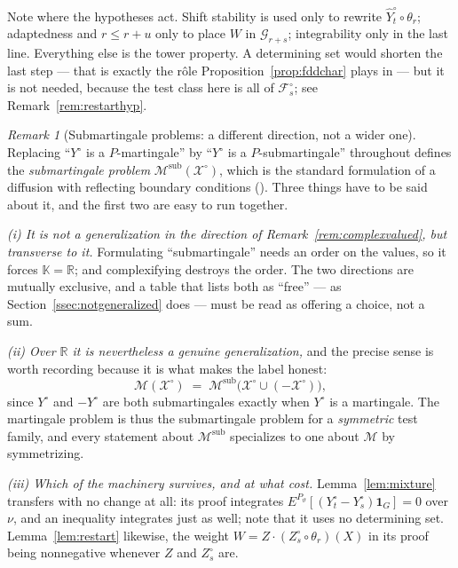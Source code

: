 \documentclass[11pt,a4paper]{article}
\theoremstyle{plain}
\theoremstyle{definition}
\theoremstyle{remark}
\newtheorem{remark}[theorem]{Remark}
\newcommand{\R}{\mathbb{R}}
\newcommand{\Filt}{\mathcal{F}}
\newcommand{\Gilt}{\mathcal{G}}
\newcommand{\SV}{\cite{SV79}}
\newcommand{\K}{\mathbb{K}}
\newcommand{\XX}{\mathcal{X}}                  %
\newcommand{\Msol}{\mathcal{M}}
\newcommand{\one}{\mathbf{1}}
\newcommand{\EK}{\cite{EK86}}
\begin{document}
Note where the hypotheses act.  Shift stability is used only to rewrite
$\hat{Y}^\circ_t \circ \theta_r$; adaptedness and $r \leq r+u$ only to place $W$
in $\Gilt_{r+s}$; integrability only in the last line.  Everything else is the
tower property.  A determining set would shorten the last step --- that is
exactly the r\^ole Proposition~\ref{prop:fddchar} plays in \EK{} --- but it is
not needed, because the test class here is all of $\Filt^\circ_s$; see
Remark~\ref{rem:restarthyp}.

\begin{remark}[Submartingale problems: a different direction, not a wider one]
  \label{rem:inequalitystable}
  Replacing ``$Y^\circ$ is a $P$-martingale'' by ``$Y^\circ$ is a
  $P$-submartingale'' throughout defines the \emph{submartingale problem}
  $\Msol^{\mathrm{sub}}(\XX^\circ)$, which is the standard formulation of a
  diffusion with reflecting boundary conditions (\SV).  Three things have to be
  said about it, and the first two are easy to run together.

  \emph{(i) It is not a generalization in the direction of
  Remark~\ref{rem:complexvalued}, but transverse to it.}  Formulating
  ``submartingale'' needs an order on the values, so it forces $\K = \R$; and
  complexifying destroys the order.  The two directions are mutually exclusive,
  and a table that lists both as ``free'' --- as
  Section~\ref{ssec:notgeneralized} does --- must be read as offering a choice,
  not a sum.

  \emph{(ii) Over $\R$ it is nevertheless a genuine generalization,} and the
  precise sense is worth recording because it is what makes the label honest:
  \begin{equation}
    \label{eq:submartsym}
    \Msol(\XX^\circ) \;=\; \Msol^{\mathrm{sub}}\bigl( \XX^\circ \cup (-\XX^\circ) \bigr) ,
  \end{equation}
  since $Y^\circ$ and $-Y^\circ$ are both submartingales exactly when $Y^\circ$ is
  a martingale.  The martingale problem is thus the submartingale problem for a
  \emph{symmetric} test family, and every statement about
  $\Msol^{\mathrm{sub}}$ specializes to one about $\Msol$ by symmetrizing.

  \emph{(iii) Which of the machinery survives, and at what cost.}
  Lemma~\ref{lem:mixture} transfers with no change at all: its proof integrates
  $E^{P_\vartheta}[(Y^\circ_t - Y^\circ_s)\one_G] = 0$ over $\nu$, and an
  inequality integrates just as well; note that it uses no determining set.
  Lemma~\ref{lem:restart} likewise, the weight
  $W = Z \cdot (Z^\circ_s \circ \theta_r)(X)$ in its proof being nonnegative
  whenever $Z$ and $Z^\circ_s$ are.


\end{remark}
\end{document}
